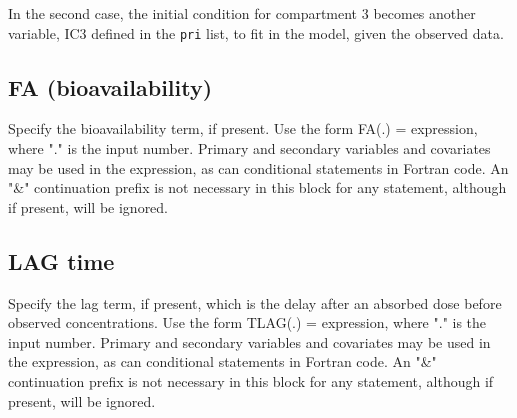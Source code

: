\documentclass[
]{book}
\newenvironment{Shaded}{\begin{snugshade}}{\end{snugshade}}
\newcommand{\AttributeTok}[1]{\textcolor[rgb]{0.77,0.63,0.00}{#1}}
\newcommand{\DecValTok}[1]{\textcolor[rgb]{0.00,0.00,0.81}{#1}}
\newcommand{\FunctionTok}[1]{\textcolor[rgb]{0.00,0.00,0.00}{#1}}
\newcommand{\NormalTok}[1]{#1}
\newcommand{\OtherTok}[1]{\textcolor[rgb]{0.56,0.35,0.01}{#1}}
\newcommand{\SpecialCharTok}[1]{\textcolor[rgb]{0.00,0.00,0.00}{#1}}
\newcommand{\StringTok}[1]{\textcolor[rgb]{0.31,0.60,0.02}{#1}}
\begin{document}
In the second case, the initial condition for compartment 3 becomes
another variable, IC3 defined in the \texttt{pri} list, to fit in the
model, given the observed data.

\hypertarget{FaR6}{%
\subsection{FA (bioavailability)}\label{FaR6}}

Specify the bioavailability term, if present. Use the form FA(.) =
expression, where "." is the input number. Primary and secondary
variables and covariates may be used in the expression, as can
conditional statements in Fortran code. An "\&" continuation prefix is not necessary in this block for any statement, although if present, will be ignored.

\begin{Shaded}
\end{Shaded}

\hypertarget{lagR6}{%
\subsection{LAG time}\label{lagR6}}

Specify the lag term, if present, which is the delay after an absorbed
dose before observed concentrations. Use the form TLAG(.) = expression, where "." is the input number. Primary and secondary variables and covariates may be used in the expression, as can conditional statements in Fortran code. An "\&" continuation prefix is not necessary in this block for any statement, although if present, will be ignored.
\end{document}
